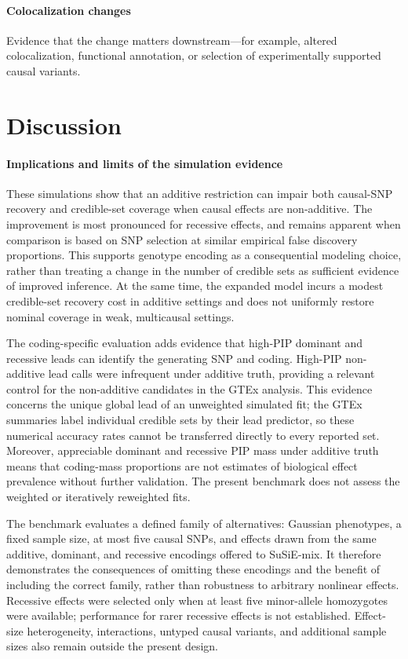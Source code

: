 \documentclass[12pt]{article}
\begin{document}
\paragraph{Colocalization changes}
Evidence that the change matters downstream—for example, altered colocalization, functional annotation, or selection of experimentally supported causal variants.

\section{Discussion}

\paragraph{Implications and limits of the simulation evidence}

These simulations show that an additive restriction can impair both
causal-SNP recovery and credible-set coverage when causal effects are
non-additive. The improvement is most pronounced for recessive effects,
and remains apparent when comparison is based on SNP selection at
similar empirical false discovery proportions. This supports genotype
encoding as a consequential modeling choice, rather than treating a
change in the number of credible sets as sufficient evidence of improved
inference. At the same time, the expanded model incurs a modest
credible-set recovery cost in additive settings and does not uniformly
restore nominal coverage in weak, multicausal settings.

The coding-specific evaluation adds evidence
that high-PIP dominant and recessive leads can identify the generating
SNP and coding. High-PIP non-additive lead calls were infrequent
under additive truth, providing a relevant control for the non-additive
candidates in the GTEx analysis. This evidence concerns the unique
global lead of an unweighted simulated fit; the GTEx summaries label
individual credible sets by their lead predictor, so these numerical
accuracy rates cannot be transferred directly to every reported set.
Moreover, appreciable dominant and recessive PIP mass under additive
truth means that coding-mass proportions are not estimates of biological
effect prevalence without further validation. The present benchmark
does not assess the weighted or iteratively reweighted fits.

The benchmark evaluates a defined family of alternatives: Gaussian
phenotypes, a fixed sample size, at most five causal SNPs, and effects
drawn from the same additive, dominant, and recessive encodings offered
to SuSiE-mix. It therefore demonstrates the consequences of omitting
these encodings and the benefit of including the correct family, rather
than robustness to arbitrary nonlinear effects. Recessive effects were
selected only when at least five minor-allele homozygotes were available;
performance for rarer recessive effects is not established. Effect-size
heterogeneity, interactions, untyped causal variants, and additional
sample sizes also remain outside the present design.
\end{document}
